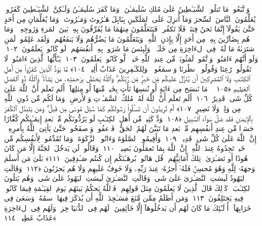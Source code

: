  وَٱتَّبَعُوا۟ مَا تَتلُوا۟ ٱلشَّيَـٰطِينُ عَلَىٰ مُلكِ سُلَيمَـٰنَ ۖ وَمَا كَفَرَ سُلَيمَـٰنُ وَلَـٰكِنَّ ٱلشَّيَـٰطِينَ كَفَرُوا۟ يُعَلِّمُونَ ٱلنَّاسَ ٱلسِّحرَ وَمَآ أُنزِلَ عَلَى ٱلمَلَكَينِ بِبَابِلَ هَـٰرُوتَ وَمَـٰرُوتَ ۚ وَمَا يُعَلِّمَانِ مِن أَحَدٍ حَتَّىٰ يَقُولَآ إِنَّمَا نَحنُ فِتنَةٌۭ فَلَا تَكفُر ۖ فَيَتَعَلَّمُونَ مِنهُمَا مَا يُفَرِّقُونَ بِهِۦ بَينَ ٱلمَرءِ وَزَوجِهِۦ ۚ وَمَا هُم بِضَآرِّينَ بِهِۦ مِن أَحَدٍ إِلَّا بِإِذنِ ٱللَّهِ ۚ وَيَتَعَلَّمُونَ مَا يَضُرُّهُم وَلَا يَنفَعُهُم ۚ وَلَقَد عَلِمُوا۟ لَمَنِ ٱشتَرَىٰهُ مَا لَهُۥ فِى ٱلءَاخِرَةِ مِن خَلَـٰقٍۢ ۚ وَلَبِئسَ مَا شَرَوا۟ بِهِۦٓ أَنفُسَهُم ۚ لَو كَانُوا۟ يَعلَمُونَ ﴿١٠٢﴾
 وَلَو أَنَّهُم ءَامَنُوا۟ وَٱتَّقَوا۟ لَمَثُوبَةٌۭ مِّن عِندِ ٱللَّهِ خَيرٌۭ ۖ لَّو كَانُوا۟ يَعلَمُونَ ﴿١٠٣﴾
 يَـٰٓأَيُّهَا ٱلَّذِينَ ءَامَنُوا۟ لَا تَقُولُوا۟ رَٰعِنَا وَقُولُوا۟ ٱنظُرنَا وَٱسمَعُوا۟ ۗ وَلِلكَـٰفِرِينَ عَذَابٌ أَلِيمٌۭ ﴿١٠٤﴾
 مَّا يَوَدُّ ٱلَّذِينَ كَفَرُوا۟ مِن أَهلِ ٱلكِتَـٰبِ وَلَا ٱلمُشرِكِينَ أَن يُنَزَّلَ عَلَيكُم مِّن خَيرٍۢ مِّن رَّبِّكُم ۗ وَٱللَّهُ يَختَصُّ بِرَحمَتِهِۦ مَن يَشَآءُ ۚ وَٱللَّهُ ذُو ٱلفَضلِ ٱلعَظِيمِ ﴿١٠٥﴾
 ۞ مَا نَنسَخ مِن ءَايَةٍ أَو نُنسِهَا نَأتِ بِخَيرٍۢ مِّنهَآ أَو مِثلِهَآ ۗ أَلَم تَعلَم أَنَّ ٱللَّهَ عَلَىٰ كُلِّ شَىءٍۢ قَدِيرٌ ﴿١٠٦﴾
 أَلَم تَعلَم أَنَّ ٱللَّهَ لَهُۥ مُلكُ ٱلسَّمَـٰوَٟتِ وَٱلأَرضِ ۗ وَمَا لَكُم مِّن دُونِ ٱللَّهِ مِن وَلِىٍّۢ وَلَا نَصِيرٍ ﴿١٠٧﴾
 أَم تُرِيدُونَ أَن تَسـَٔلُوا۟ رَسُولَكُم كَمَا سُئِلَ مُوسَىٰ مِن قَبلُ ۗ وَمَن يَتَبَدَّلِ ٱلكُفرَ بِٱلإِيمَـٰنِ فَقَد ضَلَّ سَوَآءَ ٱلسَّبِيلِ ﴿١٠٨﴾
 وَدَّ كَثِيرٌۭ مِّن أَهلِ ٱلكِتَـٰبِ لَو يَرُدُّونَكُم مِّنۢ بَعدِ إِيمَـٰنِكُم كُفَّارًا حَسَدًۭا مِّن عِندِ أَنفُسِهِم مِّنۢ بَعدِ مَا تَبَيَّنَ لَهُمُ ٱلحَقُّ ۖ فَٱعفُوا۟ وَٱصفَحُوا۟ حَتَّىٰ يَأتِىَ ٱللَّهُ بِأَمرِهِۦٓ ۗ إِنَّ ٱللَّهَ عَلَىٰ كُلِّ شَىءٍۢ قَدِيرٌۭ ﴿١٠٩﴾
 وَأَقِيمُوا۟ ٱلصَّلَوٰةَ وَءَاتُوا۟ ٱلزَّكَوٰةَ ۚ وَمَا تُقَدِّمُوا۟ لِأَنفُسِكُم مِّن خَيرٍۢ تَجِدُوهُ عِندَ ٱللَّهِ ۗ إِنَّ ٱللَّهَ بِمَا تَعمَلُونَ بَصِيرٌۭ ﴿١١٠﴾
 وَقَالُوا۟ لَن يَدخُلَ ٱلجَنَّةَ إِلَّا مَن كَانَ هُودًا أَو نَصَـٰرَىٰ ۗ تِلكَ أَمَانِيُّهُم ۗ قُل هَاتُوا۟ بُرهَـٰنَكُم إِن كُنتُم صَـٰدِقِينَ ﴿١١١﴾
 بَلَىٰ مَن أَسلَمَ وَجهَهُۥ لِلَّهِ وَهُوَ مُحسِنٌۭ فَلَهُۥٓ أَجرُهُۥ عِندَ رَبِّهِۦ وَلَا خَوفٌ عَلَيهِم وَلَا هُم يَحزَنُونَ ﴿١١٢﴾
 وَقَالَتِ ٱليَهُودُ لَيسَتِ ٱلنَّصَـٰرَىٰ عَلَىٰ شَىءٍۢ وَقَالَتِ ٱلنَّصَـٰرَىٰ لَيسَتِ ٱليَهُودُ عَلَىٰ شَىءٍۢ وَهُم يَتلُونَ ٱلكِتَـٰبَ ۗ كَذَٟلِكَ قَالَ ٱلَّذِينَ لَا يَعلَمُونَ مِثلَ قَولِهِم ۚ فَٱللَّهُ يَحكُمُ بَينَهُم يَومَ ٱلقِيَـٰمَةِ فِيمَا كَانُوا۟ فِيهِ يَختَلِفُونَ ﴿١١٣﴾
 وَمَن أَظلَمُ مِمَّن مَّنَعَ مَسَـٰجِدَ ٱللَّهِ أَن يُذكَرَ فِيهَا ٱسمُهُۥ وَسَعَىٰ فِى خَرَابِهَآ ۚ أُو۟لَـٰٓئِكَ مَا كَانَ لَهُم أَن يَدخُلُوهَآ إِلَّا خَآئِفِينَ ۚ لَهُم فِى ٱلدُّنيَا خِزىٌۭ وَلَهُم فِى ٱلءَاخِرَةِ عَذَابٌ عَظِيمٌۭ ﴿١١٤﴾
